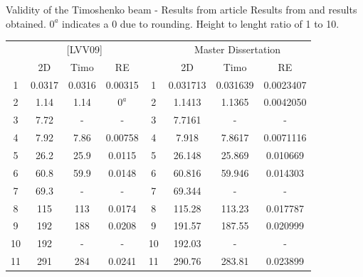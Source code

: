 \documentclass[8pt]{beamer}
\begin{document}
        \begin{frame}{Validity of the Timoshenko beam - Results from article}
            \centering
            \footnotesize
            \renewcommand{\arraystretch}{0.9}
            Results from \cite{LVV09} and results obtained. $0^a$ indicates a 0 due to rounding. Height to lenght ratio of 1 to 10.
        
            \begin{tabular}{cccc|cccc}
                \hline
                & \multicolumn{3}{c}{[LVV09]} & & \multicolumn{3}{c}{Master Dissertation} \\
                
                & 2D & Timo & RE & & 2D & Timo & RE \\
                \hline
                1 & 0.0317 & 0.0316 & 0.00315 & 1 & 0.031713 & 0.031639 & 0.0023407 \\
                2 & 1.14 & 1.14 & $0^a$ & 2 & 1.1413 & 1.1365 & 0.0042050 \\
                3 & 7.72 & - & - & 3 & 7.7161 & - & - \\
                4 & 7.92 & 7.86 & 0.00758 & 4 & 7.918 & 7.8617 & 0.0071116 \\
                5 & 26.2 & 25.9 & 0.0115 & 5 & 26.148 & 25.869 & 0.010669 \\
                6 & 60.8 & 59.9 & 0.0148 & 6 & 60.816 & 59.946 & 0.014303 \\
                7 & 69.3 & - & - & 7 & 69.344 & - & - \\
                8 & 115 & 113 & 0.0174 & 8 & 115.28 & 113.23 & 0.017787 \\
                9 & 192 & 188 & 0.0208 & 9 & 191.57 & 187.55 & 0.020999 \\
                10 & 192 & - & - & 10 & 192.03 & - & - \\
                11 & 291 & 284 & 0.0241 & 11 & 290.76 & 283.81 & 0.023899 \\
                \hline
            \end{tabular}
        
        \end{frame}
        
        
\end{document}
